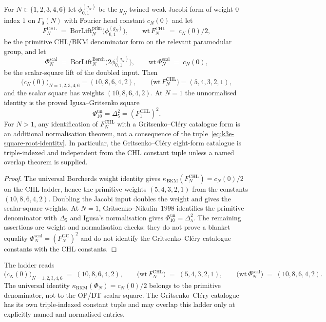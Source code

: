 \begin{proposition}
\label{prop:k3e-square-root-normalisation}
For $N \in \{1, 2, 3, 4, 6\}$ let $\phi^{(g_N)}_{0, 1}$ be the $g_N$-twined weak Jacobi form of weight $0$ index $1$ on $\Gamma_0(N)$ with Fourier head constant $c_N(0)$ and let
\[
F^{\mathrm{CHL}}_N \;=\; \mathrm{BorLift}^{\mathrm{prim}}_N\bigl(\phi^{(g_N)}_{0, 1}\bigr), \qquad \mathrm{wt}\,F^{\mathrm{CHL}}_N \;=\; c_N(0)/2,
\]
be the primitive CHL/BKM denominator form on the relevant paramodular group, and let
\[
\Phi_N^{\mathrm{scal}} \;=\; \mathrm{BorLift}^{\mathrm{Borch}}_N\bigl(2\phi^{(g_N)}_{0, 1}\bigr), \qquad \mathrm{wt}\,\Phi_N^{\mathrm{scal}} \;=\; c_N(0),
\]
be the scalar-square lift of the doubled input. Then
\begin{equation}
\label{eq:k3e-square-root-identity}
\bigl(c_N(0)\bigr)_{N = 1, 2, 3, 4, 6}=(10,8,6,4,2),\qquad
\bigl(\mathrm{wt}\,F^{\mathrm{CHL}}_N\bigr)=(5,4,3,2,1),
\end{equation}
and the scalar square has weights $(10,8,6,4,2)$. At $N=1$ the unnormalised identity is the proved Igusa--Gritsenko square
\[
\Phi_{10}^{\mathrm{un}}=\Delta_5^2=(F^{\mathrm{CHL}}_1)^2.
\]
For $N>1$, any identification of $F^{\mathrm{CHL}}_N$ with a Gritsenko--Cl\'ery catalogue form is an additional normalisation theorem, not a consequence of the tuple~\eqref{eq:k3e-square-root-identity}. In particular, the Gritsenko--Cl\'ery eight-form catalogue is triple-indexed and independent from the CHL constant tuple unless a named overlap theorem is supplied.
\end{proposition}

\begin{proof}
The universal Borcherds weight identity gives
$\kappa_{\mathrm{BKM}}(F^{\mathrm{CHL}}_N)=c_N(0)/2$ on the CHL ladder, hence the primitive weights $(5,4,3,2,1)$ from the constants $(10,8,6,4,2)$. Doubling the Jacobi input doubles the weight and gives the scalar-square weights. At $N=1$, Gritsenko--Nikulin~$1998$ identifies the primitive denominator with $\Delta_5$ and Igusa's normalisation gives $\Phi_{10}^{\mathrm{un}}=\Delta_5^2$. The remaining assertions are weight and normalisation checks: they do not prove a blanket equality $\Phi_N^{\mathrm{scal}}=(F_N^{\mathrm{GC}})^2$ and do not identify the Gritsenko--Cl\'ery catalogue constants with the CHL constants.
\end{proof}

\begin{remark}
\label{rem:k3e-square-root-tuple}
The ladder reads
\[
\bigl(c_N(0)\bigr)_{N = 1, 2, 3, 4, 6} \;=\; (10, 8, 6, 4, 2), \qquad
\bigl(\mathrm{wt}\,F^{\mathrm{CHL}}_N\bigr) \;=\; (5, 4, 3, 2, 1), \qquad
\bigl(\mathrm{wt}\,\Phi_N^{\mathrm{scal}}\bigr) \;=\; (10, 8, 6, 4, 2).
\]
The universal identity $\kappa_{\mathrm{BKM}}(\Phi_N) = c_N(0)/2$ belongs to the primitive denominator, not to the OP/DT scalar square. The Gritsenko--Cl\'ery catalogue has its own triple-indexed constant tuple and may overlap this ladder only at explicitly named and normalised entries.
\end{remark}

